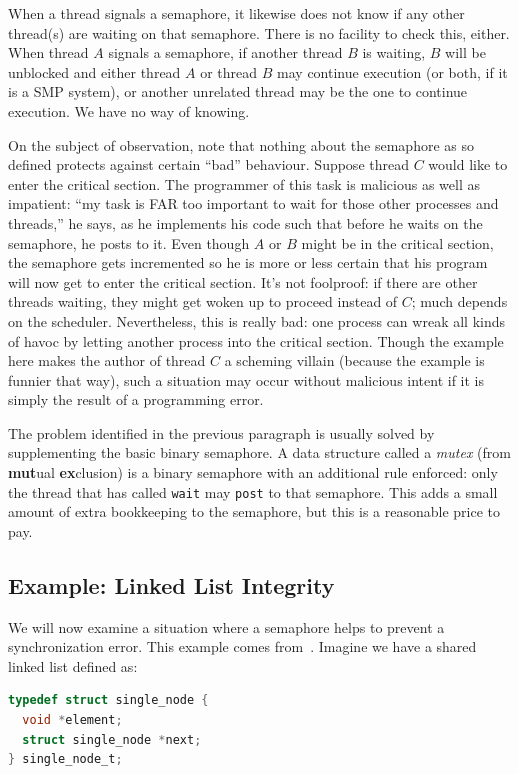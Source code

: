 \documentclass[a4paper]{report}
\begin{document}
\begin{appendices}
When a thread signals a semaphore, it likewise does not know if any other thread(s) are waiting on that semaphore. There is no facility to check this, either. When thread $A$ signals a semaphore, if another thread $B$ is waiting, $B$ will be unblocked and either thread $A$ or thread $B$ may continue execution (or both, if it is a SMP system), or another unrelated thread may be the one to continue execution. We have no way of knowing.

On the subject of observation, note that nothing about the semaphore as so defined protects against certain ``bad'' behaviour. Suppose thread $C$ would like to enter the critical section. The programmer of this task is malicious as well as impatient: ``my task is FAR too important to wait for those other processes and threads,'' he says, as he implements his code such that before he waits on the semaphore, he posts to it. Even though $A$ or $B$ might be in the critical section, the semaphore gets incremented so he is more or less certain that his program will now get to enter the critical section. It's not foolproof: if there are other threads waiting, they might get woken up to proceed instead of $C$; much depends on the scheduler. Nevertheless, this is really bad: one process can wreak all kinds of havoc by letting another process into the critical section. Though the example here makes the author of thread $C$ a scheming villain (because the example is funnier that way), such a situation may occur without malicious intent if it is simply the result of a programming error.

The problem identified in the previous paragraph is usually solved by supplementing the basic binary semaphore. A data structure called a \textit{mutex} (from \textbf{mut}ual \textbf{ex}clusion) is a binary semaphore with an additional rule enforced: only the thread that has called \texttt{wait} may \texttt{post} to that semaphore. This adds a small amount of extra bookkeeping to the semaphore, but this is a reasonable price to pay.

\subsection*{Example: Linked List Integrity}
We will now examine a situation where a semaphore helps to prevent a synchronization error. This example comes from~\cite{mte241}. Imagine we have a shared linked list defined as:

\begin{lstlisting}[language=C]
typedef struct single_node {
  void *element;
  struct single_node *next;
} single_node_t;


\end{lstlisting}
\end{appendices}
\end{document}
